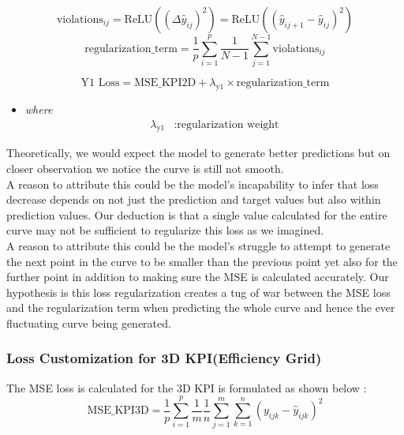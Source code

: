 \documentclass{report} %
\begin{document}

\[
\text{violations}_{ij} = \text{ReLU}((\Delta \hat{y}_{ij})^2) = \text{ReLU}((\hat{y}_{i{j+1}} - \hat{y}_{ij})^2)
\]
\[
\text{regularization\_term} = \frac{1}{p} \sum_{i=1}^{p}\frac{1}{N-1} \sum_{j=1}^{N-1} \text{violations}_{ij}
\]

\[
\text{Y1 Loss} = \text{MSE\_KPI2D} + \lambda_{\text{y1}} \times \text{regularization\_term}
\]

\begin{itemize}
    \item[] \textit{where}
       \begin{align*}
       \lambda_{\text{y1}} &: \text{regularization weight}
       \end{align*}
\end{itemize}

Theoretically, we would expect the model to generate better predictions but on closer observation we notice the curve is still not smooth. \\
A reason to attribute this could be the model's incapability to infer that loss decrease depends on not just the prediction and target values but also within prediction values.
Our deduction is that a single value calculated for the entire curve may not be sufficient to regularize this loss as we imagined. \\

A reason to attribute this could be the model's struggle to attempt to generate the next point in the curve to be smaller than the previous point yet also for the further point in addition to making sure the \ac{MSE} is calculated accurately.
Our hypothesis is this loss regularization creates a tug of war between the \ac{MSE} loss and the regularization term when predicting the whole curve and hence the ever fluctuating curve being generated.\\


\subsubsection*{Loss Customization for \ac{3D} \ac{KPI}(Efficiency Grid)}

The \ac{MSE} loss is calculated for the \ac{3D} \ac{KPI} is formulated as shown below :
\[
\text{MSE\_KPI3D} = \frac{1}{p} \sum_{i=1}^{p} \frac{1}{m} \frac{1}{n} \sum_{j=1}^{m} \sum_{k=1}^{n} (y_{ijk} - \hat{y}_{ijk})^2
\]
\end{document}
